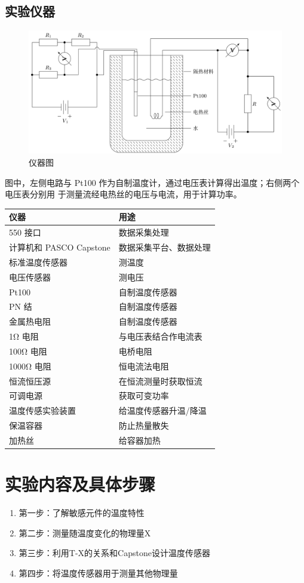 \documentclass[a4paper]{../phyreport}
\begin{document}
\subsection{实验仪器}
\begin{figure}[H]
\centerline{\includegraphics[width=.7\linewidth]{测量水比热/20240507200239.png}}
\caption[]{\label{fig:equi}仪器图}
\end{figure}
图中，左侧电路与 Pt100 作为自制温度计，通过电压表计算得出温度；右侧两个电压表分别用
于测量流经电热丝的电压与电流，用于计算功率。

\begin{table}[H]
  \caption[]{\label{tab:equi}仪器列表 }
\centering
  \begin{longtable}{ll}
    \hline
    仪器 & 用途 \\
    \hline
    550 接口&数据采集处理\\
    计算机和 PASCO Capstone&数据采集平台、数据处理\\
    标准温度传感器&测温度\\
    电压传感器&测电压\\
    Pt100&自制温度传感器\\
    PN 结&自制温度传感器\\
    金属热电阻&自制温度传感器\\
    1Ω 电阻&与电压表结合作电流表\\
    100Ω 电阻&电桥电阻\\
    1000Ω 电阻&恒电流法电阻\\
    恒流恒压源&在恒流测量时获取恒流\\
    可调电源&获取可变功率\\
    温度传感实验装置&给温度传感器升温/降温\\
    保温容器&防止热量散失\\
    加热丝&给容器加热\\
    \hline
\end{longtable}
\end{table}
\longLine
\section{实验内容及具体步骤}
\begin{enumerate}
\item 第一步：了解敏感元件的温度特性
\item 第二步：测量随温度变化的物理量X
\item 第三步：利用T-X的关系和Capstone设计温度传感器
\item 第四步：将温度传感器用于测量其他物理量
\end{enumerate}
\end{document}
